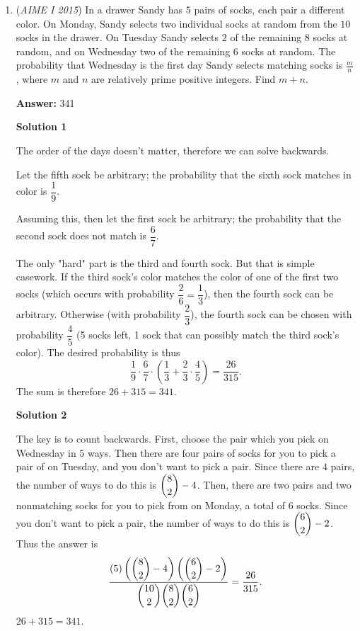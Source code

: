 \begin{enumerate}
 Through midpoint formulae on both $CD$ and $AE$ points $M$ and $N$ satisfy $M(14, -4\sqrt{3})$, $N(9, -\sqrt{3})$.

 Finally, Shoelace formula on figure $BMN$ yields the desired $\mathcal{X} = 13\sqrt{3}$, thus implying $\mathcal{X}^2 = \boxed{507}$. $\square$



	\item (\textit{AIME I 2015}) In a drawer Sandy has $5$ pairs of socks, each pair a different color.  On Monday, Sandy selects two individual socks at random from the $10$ socks in the drawer.  On Tuesday Sandy selects $2$ of the remaining $8$ socks at random, and on Wednesday two of the remaining $6$ socks at random.  The probability that Wednesday is the first day Sandy selects matching socks is $\frac{m}{n}$, where $m$ and $n$ are relatively prime positive integers. Find $m+n$.


 



 
 \textbf{Answer: }341



\textbf{Solution 1}

The order of the days doesn't matter, therefore we can solve backwards. 

 Let the fifth sock be arbitrary; the probability that the sixth sock matches in color is $\dfrac{1}{9}$. 

 Assuming this, then let the first sock be arbitrary; the probability that the second sock does not match is $\dfrac{6}{7}.$

 The only "hard" part is the third and fourth sock. But that is simple casework. If the third sock's color matches the color of one of the first two socks (which occurs with probability $\dfrac{2}{6} = \dfrac{1}{3}$), then the fourth sock can be arbitrary. Otherwise (with probability $\dfrac{2}{3}$), the fourth sock can be chosen with probability $\dfrac{4}{5}$ (5 socks left, 1 sock that can possibly match the third sock's color). The desired probability is thus
 \[\frac{1}{9} \cdot \frac{6}{7} \cdot \left(\dfrac{1}{3} + \dfrac{2}{3} \cdot \dfrac{4}{5}\right) = \frac{26}{315}.\]The sum is therefore $26+315=\boxed{341}.$




\textbf{Solution 2}

The key is to count backwards. First, choose the pair which you pick on Wednesday in $5$ ways. Then there are four pairs of socks for you to pick a pair of on Tuesday, and you don't want to pick a pair. Since there are $4$ pairs, the number of ways to do this is $\dbinom{8}{2}-4$. Then, there are two pairs and two nonmatching socks for you to pick from on Monday, a total of $6$ socks. Since you don't want to pick a pair, the number of ways to do this is $\dbinom{6}{2}-2$. Thus the answer is
 \[\dfrac{\left(5\right)\left(\dbinom{8}{2}-4\right)\left(\dbinom{6}{2}-2\right)}{\dbinom{10}{2}\dbinom{8}{2}\dbinom{6}{2}}=\dfrac{26}{315}.\]$26 + 315 = \boxed{341}$.


\end{enumerate}
